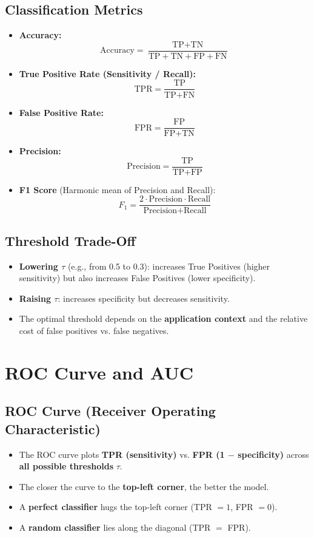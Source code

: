 \documentclass{article}
\begin{document}
\subsection{Classification Metrics}
\begin{itemize}
    \item \textbf{Accuracy:}
    $$\text{Accuracy} = \frac{\text{TP} + \text{TN}}{\text{TP} + \text{TN} + \text{FP} + \text{FN}}$$
    \item \textbf{True Positive Rate (Sensitivity / Recall):}
    $$\text{TPR} = \frac{\text{TP}}{\text{TP} + \text{FN}}$$
    \item \textbf{False Positive Rate:}
    $$\text{FPR} = \frac{\text{FP}}{\text{FP} + \text{TN}}$$
    \item \textbf{Precision:}
    $$\text{Precision} = \frac{\text{TP}}{\text{TP} + \text{FP}}$$
    \item \textbf{F1 Score} (Harmonic mean of Precision and Recall):
    $$F_1 = \frac{2 \cdot \text{Precision} \cdot \text{Recall}}{\text{Precision} + \text{Recall}}$$
\end{itemize}

\subsection{Threshold Trade-Off}
\begin{itemize}
    \item \textbf{Lowering $\tau$} (e.g., from 0.5 to 0.3): increases True Positives (higher sensitivity) but also increases False Positives (lower specificity).
    \item \textbf{Raising $\tau$}: increases specificity but decreases sensitivity.
    \item The optimal threshold depends on the \textbf{application context} and the relative cost of false positives vs. false negatives.
\end{itemize}

\newpage
\section{ROC Curve and AUC}

\subsection{ROC Curve (Receiver Operating Characteristic)}
\begin{itemize}
    \item The ROC curve plots \textbf{TPR (sensitivity)} vs. \textbf{FPR (1 $-$ specificity)} across \textbf{all possible thresholds} $\tau$.
    \item The closer the curve to the \textbf{top-left corner}, the better the model.
    \item A \textbf{perfect classifier} hugs the top-left corner (TPR $= 1$, FPR $= 0$).
    \item A \textbf{random classifier} lies along the diagonal (TPR $=$ FPR).
\end{itemize}
\end{document}
